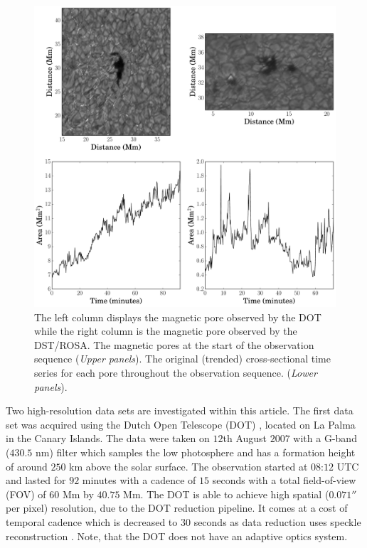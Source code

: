     \begin{figure}
        \centering
        \includegraphics[width=\textwidth]{overview.pdf}
        \caption{
		         The left column displays the magnetic pore observed by the DOT while the right column is the magnetic pore observed by the DST/ROSA. 	
	        	 The magnetic pores at the start of the observation sequence (\textit{Upper panels}).
	             The original (trended) cross-sectional time series for each pore throughout the observation sequence. (\textit{Lower panels}).}
        \label{overview}
    \end{figure}
    
    Two high-resolution data sets are investigated within this article.
    The first data set was acquired using the Dutch Open Telescope (DOT) \citep{rutten}, located on La Palma in the Canary Islands. 
    The data were taken on $12$th August $2007$ with a G-band ($430.5$ nm) filter which samples the low photosphere and has a formation height of around $250$ km above the solar surface.
    The observation started at $08$:$12$ UTC and lasted for $92$ minutes with a cadence of $15$ seconds with a total field-of-view (FOV) of $60$ Mm by $40.75$ Mm.
    The DOT is able to achieve high spatial ($0.071''$ per pixel) resolution, due to the DOT reduction pipeline.
    It comes at a cost of temporal cadence which is decreased to $30$ seconds as data reduction uses speckle reconstruction \cite[]{1992A&A...261..321K}.
    Note, that the DOT does not have an adaptive optics system.
    

